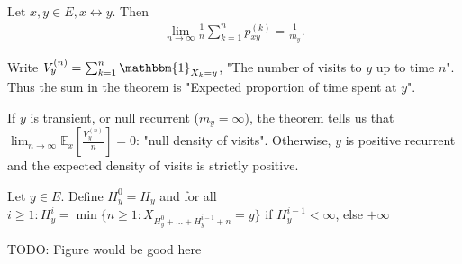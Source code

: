 \begin{theorem}[]
	Let $x,y \in E, x \leftrightarrow y$. Then 
	\begin{align}
	\boxed{\lim_{n \to \infty}\frac{1}{n}\sum_{k=1}^{n} p_{xy}^{(k)}=\frac{1}{m_{y}}}
	.\end{align}
\end{theorem}
\begin{rmk}[]
	Write $V_{y}^{(n)}=\sum_{k=1}^{n} \mathbbm{1}_{X_k=y}$, "The number of visits to $y$ up to time $n$". Thus the sum in the theorem is "Expected proportion of time spent at $y$".
\end{rmk}

If $y$ is transient, or null recurrent ($m_y=\infty$), the theorem tells us that $\lim_{n \to \infty}\mathbb{E}_{x} \left[ \frac{V_y^{(n)}}{n} \right] =0$: "null density of visits". Otherwise, $y$ is positive recurrent and the expected density of visits is strictly positive.

\begin{defn}
	Let $y \in E$. Define $H_y^{0}=H_y$ and for all $i\geq 1: H_{y}^{i}= \min\{n \geq 1: X_{H_y^0 +  \ldots  + H_y^{i-1}+n}=y\}$ if $H_y^{i-1}<\infty$, else $+\infty$	
\end{defn}
TODO: Figure would be good here

